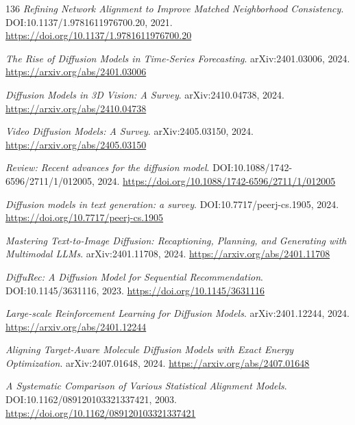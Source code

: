 \documentclass[11pt,a4paper]{article}
\begin{document}
\begin{thebibliography}{136}
\newblock \emph{Refining Network Alignment to Improve Matched Neighborhood Consistency}.
\newblock DOI:10.1137/1.9781611976700.20, 2021.
\newblock \url{https://doi.org/10.1137/1.9781611976700.20}

\newblock \emph{The Rise of Diffusion Models in Time-Series Forecasting}.
\newblock arXiv:2401.03006, 2024.
\newblock \url{https://arxiv.org/abs/2401.03006}

\newblock \emph{Diffusion Models in 3D Vision: A Survey}.
\newblock arXiv:2410.04738, 2024.
\newblock \url{https://arxiv.org/abs/2410.04738}

\newblock \emph{Video Diffusion Models: A Survey}.
\newblock arXiv:2405.03150, 2024.
\newblock \url{https://arxiv.org/abs/2405.03150}

\newblock \emph{Review: Recent advances for the diffusion model}.
\newblock DOI:10.1088/1742-6596/2711/1/012005, 2024.
\newblock \url{https://doi.org/10.1088/1742-6596/2711/1/012005}

\newblock \emph{Diffusion models in text generation: a survey}.
\newblock DOI:10.7717/peerj-cs.1905, 2024.
\newblock \url{https://doi.org/10.7717/peerj-cs.1905}

\newblock \emph{Mastering Text-to-Image Diffusion: Recaptioning, Planning, and Generating with Multimodal LLMs}.
\newblock arXiv:2401.11708, 2024.
\newblock \url{https://arxiv.org/abs/2401.11708}

\newblock \emph{DiffuRec: A Diffusion Model for Sequential Recommendation}.
\newblock DOI:10.1145/3631116, 2023.
\newblock \url{https://doi.org/10.1145/3631116}

\newblock \emph{Large-scale Reinforcement Learning for Diffusion Models}.
\newblock arXiv:2401.12244, 2024.
\newblock \url{https://arxiv.org/abs/2401.12244}

\newblock \emph{Aligning Target-Aware Molecule Diffusion Models with Exact Energy Optimization}.
\newblock arXiv:2407.01648, 2024.
\newblock \url{https://arxiv.org/abs/2407.01648}

\newblock \emph{A Systematic Comparison of Various Statistical Alignment Models}.
\newblock DOI:10.1162/089120103321337421, 2003.
\newblock \url{https://doi.org/10.1162/089120103321337421}


\end{thebibliography}
\end{document}
